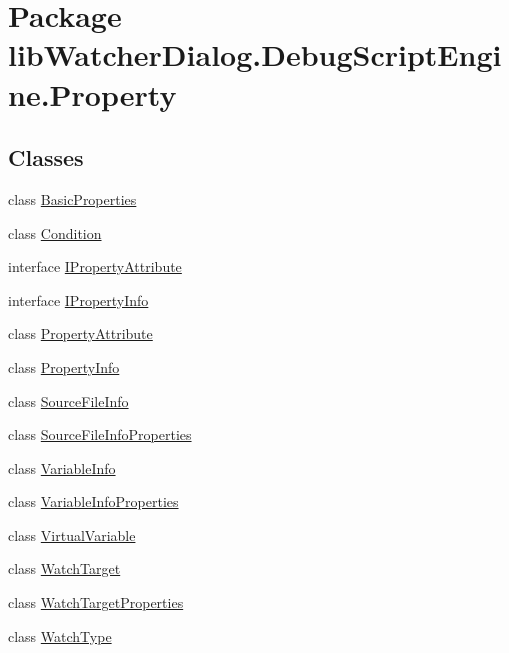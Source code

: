 \hypertarget{namespacelib_watcher_dialog_1_1_debug_script_engine_1_1_property}{\section{Package lib\+Watcher\+Dialog.\+Debug\+Script\+Engine.\+Property}
\label{namespacelib_watcher_dialog_1_1_debug_script_engine_1_1_property}
}
\subsection*{Classes}
\begin{DoxyCompactItemize}
\item 
class \hyperlink{classlib_watcher_dialog_1_1_debug_script_engine_1_1_property_1_1_basic_properties}{Basic\+Properties}
\item 
class \hyperlink{classlib_watcher_dialog_1_1_debug_script_engine_1_1_property_1_1_condition}{Condition}
\item 
interface \hyperlink{interfacelib_watcher_dialog_1_1_debug_script_engine_1_1_property_1_1_i_property_attribute}{I\+Property\+Attribute}
\item 
interface \hyperlink{interfacelib_watcher_dialog_1_1_debug_script_engine_1_1_property_1_1_i_property_info}{I\+Property\+Info}
\item 
class \hyperlink{classlib_watcher_dialog_1_1_debug_script_engine_1_1_property_1_1_property_attribute}{Property\+Attribute}
\item 
class \hyperlink{classlib_watcher_dialog_1_1_debug_script_engine_1_1_property_1_1_property_info}{Property\+Info}
\item 
class \hyperlink{classlib_watcher_dialog_1_1_debug_script_engine_1_1_property_1_1_source_file_info}{Source\+File\+Info}
\item 
class \hyperlink{classlib_watcher_dialog_1_1_debug_script_engine_1_1_property_1_1_source_file_info_properties}{Source\+File\+Info\+Properties}
\item 
class \hyperlink{classlib_watcher_dialog_1_1_debug_script_engine_1_1_property_1_1_variable_info}{Variable\+Info}
\item 
class \hyperlink{classlib_watcher_dialog_1_1_debug_script_engine_1_1_property_1_1_variable_info_properties}{Variable\+Info\+Properties}
\item 
class \hyperlink{classlib_watcher_dialog_1_1_debug_script_engine_1_1_property_1_1_virtual_variable}{Virtual\+Variable}
\item 
class \hyperlink{classlib_watcher_dialog_1_1_debug_script_engine_1_1_property_1_1_watch_target}{Watch\+Target}
\item 
class \hyperlink{classlib_watcher_dialog_1_1_debug_script_engine_1_1_property_1_1_watch_target_properties}{Watch\+Target\+Properties}
\item 
class \hyperlink{classlib_watcher_dialog_1_1_debug_script_engine_1_1_property_1_1_watch_type}{Watch\+Type}
\end{DoxyCompactItemize}
